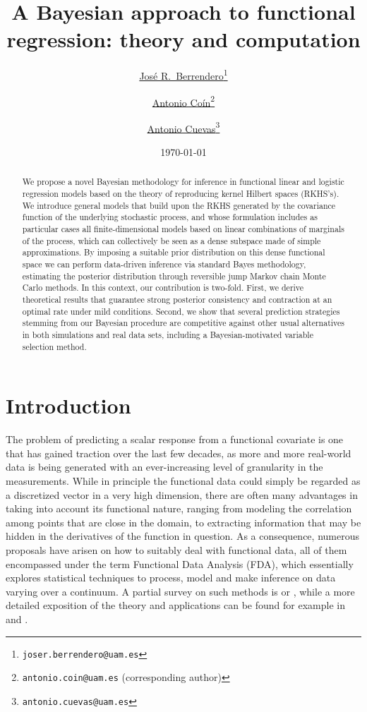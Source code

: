 \documentclass{article}
\title{A Bayesian approach to functional regression: theory and computation}
\date{\today}
\author[1,2]{%
	\href{https://orcid.org/0000-0003-0728-7748}{\usebox{\orcid}\hspace{1mm}José R.~Berrendero\thanks{\texttt{\href{mailto:joser.berrendero@uam.es}{joser.berrendero@uam.es}}}}%
}
\author[1]{%
	\href{https://orcid.org/0009-0004-7554-9193}{\usebox{\orcid}\hspace{1mm}Antonio Coín\thanks{\texttt{\href{mailto:antonio.coin@uam.es}{antonio.coin@uam.es}} (corresponding author)}}%
}
\author[1,2]{%
	\href{https://orcid.org/0000-0002-7993-0096}{\usebox{\orcid}\hspace{1mm}Antonio Cuevas\thanks{\texttt{\href{mailto:antonio.cuevas@uam.es}{antonio.cuevas@uam.es}}}}%
}
\affil[1]{Departamento de Matemáticas, Universidad Autónoma de Madrid (UAM), Madrid, Spain}
\affil[2]{Instituto de Ciencias Matemáticas ICMAT (CSIC-UAM-UC3M-UCM), Madrid, Spain}
\numberwithin{equation}{section}
\theoremstyle{plain}
\theoremstyle{definition}
\begin{document}
\maketitle

\begin{abstract}
  We propose a novel Bayesian methodology for inference in functional linear and logistic regression models based on the theory of reproducing kernel Hilbert spaces (RKHS's). We introduce general models that build upon the RKHS generated by the covariance function of the underlying stochastic process, and whose formulation includes as particular cases all finite-dimensional models based on linear combinations of marginals of the process, which can collectively be seen as a dense subspace made of simple approximations. By imposing a suitable prior distribution on this dense functional space we can perform data-driven inference via standard Bayes methodology, estimating the posterior distribution through reversible jump Markov chain Monte Carlo methods. In this context, our contribution is two-fold. First, we derive theoretical results that guarantee strong posterior consistency and contraction at an optimal rate under mild conditions. Second, we show that several prediction strategies stemming from our Bayesian procedure are competitive against other usual alternatives in both simulations and real data sets, including a Bayesian-motivated variable selection method.
  \end{abstract}




\section{Introduction}\label{sec:intro}

The problem of predicting a scalar response from a functional covariate is one that has gained traction over the last few decades, as more and more real-world data is being generated with an ever-increasing level of granularity in the measurements. While in principle the functional data could simply be regarded as a discretized vector in a very high dimension, there are often many advantages in taking into account its functional nature, ranging from modeling the correlation among points that are close in the domain, to extracting information that may be hidden in the derivatives of the function in question. As a consequence, numerous proposals have arisen on how to suitably deal with functional data, all of them encompassed under the term Functional Data Analysis (FDA), which essentially explores statistical techniques to process, model and make inference on data varying over a continuum. A partial survey on such methods is \citet{cuevas2014partial} or \citet{goia2016introduction}, while a more detailed exposition of the theory and applications can be found for example in \citet{hsing2015theoretical} and \citet{horvath2012inference}.
\end{document}
